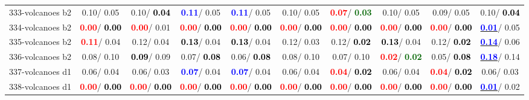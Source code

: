 \begin{table}[h]
\begin{center}
{\begin{tabular}{lc|c|c|c|c|c|c|c|c}
333-volcanoes b2 &   0.10/  0.05 &   0.10/\textcolor{black}{\textbf{  0.04}} & \textcolor{blue}{\textbf{  0.11}}/  0.05 & \textcolor{blue}{\textbf{  0.11}}/  0.05 &   0.10/  0.05 & \textcolor{red}{\textbf{  0.07}}/\textcolor{darkgreen}{\textbf{  0.03}} &   0.10/  0.05 &   0.09/  0.05 &   0.10/\textcolor{black}{\textbf{  0.04}} \\
334-volcanoes b2 & \textcolor{red}{\textbf{  0.00}}/\textcolor{black}{\textbf{  0.00}} & \textcolor{red}{\textbf{  0.00}}/  0.01 & \textcolor{red}{\textbf{  0.00}}/\textcolor{black}{\textbf{  0.00}} & \textcolor{red}{\textbf{  0.00}}/\textcolor{black}{\textbf{  0.00}} & \textcolor{red}{\textbf{  0.00}}/\textcolor{black}{\textbf{  0.00}} & \textcolor{red}{\textbf{  0.00}}/\textcolor{black}{\textbf{  0.00}} & \textcolor{red}{\textbf{  0.00}}/\textcolor{black}{\textbf{  0.00}} & \textcolor{red}{\textbf{  0.00}}/\textcolor{black}{\textbf{  0.00}} & \underline{\textcolor{blue}{\textbf{  0.01}}}/  0.05 \\ \hline
335-volcanoes b2 & \textcolor{red}{\textbf{  0.11}}/  0.04 &   0.12/  0.04 & \textcolor{black}{\textbf{  0.13}}/  0.04 & \textcolor{black}{\textbf{  0.13}}/  0.04 &   0.12/  0.03 &   0.12/\textcolor{black}{\textbf{  0.02}} & \textcolor{black}{\textbf{  0.13}}/  0.04 &   0.12/\textcolor{black}{\textbf{  0.02}} & \underline{\textcolor{blue}{\textbf{  0.14}}}/  0.06 \\
336-volcanoes b2 &   0.08/  0.10 & \textcolor{black}{\textbf{  0.09}}/  0.09 &   0.07/\textcolor{black}{\textbf{  0.08}} &   0.06/\textcolor{black}{\textbf{  0.08}} &   0.08/  0.10 &   0.07/  0.10 & \textcolor{red}{\textbf{  0.02}}/\textcolor{darkgreen}{\textbf{  0.02}} &   0.05/\textcolor{black}{\textbf{  0.08}} & \underline{\textcolor{blue}{\textbf{  0.18}}}/  0.14 \\
337-volcanoes d1 &   0.06/  0.04 &   0.06/  0.03 & \textcolor{blue}{\textbf{  0.07}}/  0.04 & \textcolor{blue}{\textbf{  0.07}}/  0.04 &   0.06/  0.04 & \textcolor{red}{\textbf{  0.04}}/\textcolor{black}{\textbf{  0.02}} &   0.06/  0.04 & \textcolor{red}{\textbf{  0.04}}/\textcolor{black}{\textbf{  0.02}} &   0.06/  0.03 \\
338-volcanoes d1 & \textcolor{red}{\textbf{  0.00}}/\textcolor{black}{\textbf{  0.00}} & \textcolor{red}{\textbf{  0.00}}/\textcolor{black}{\textbf{  0.00}} & \textcolor{red}{\textbf{  0.00}}/\textcolor{black}{\textbf{  0.00}} & \textcolor{red}{\textbf{  0.00}}/\textcolor{black}{\textbf{  0.00}} & \textcolor{red}{\textbf{  0.00}}/\textcolor{black}{\textbf{  0.00}} & \textcolor{red}{\textbf{  0.00}}/\textcolor{black}{\textbf{  0.00}} & \textcolor{red}{\textbf{  0.00}}/\textcolor{black}{\textbf{  0.00}} & \textcolor{red}{\textbf{  0.00}}/\textcolor{black}{\textbf{  0.00}} & \underline{\textcolor{blue}{\textbf{  0.01}}}/  0.02 \\

\end{tabular}}
\end{center}
\end{table}
